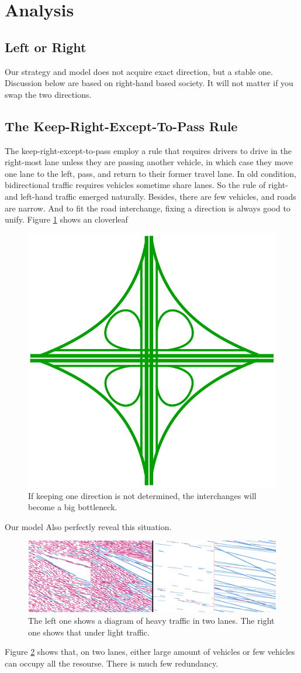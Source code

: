 \section{Analysis}
\subsection{Left or Right}
Our strategy and model does not acquire exact direction, but a stable one. Discussion below are based on right-hand based society. It will not matter if you swap the two directions. 

\subsection{The Keep-Right-Except-To-Pass Rule}
The keep-right-except-to-pass employ a rule that requires drivers to drive in the right-most lane unless they are passing another vehicle, in which case they move one lane to the left, pass, and return to their former travel lane. 
In old condition, bidirectional traffic requires vehicles sometime share lanes. 
So the rule of right- and left-hand traffic emerged naturally. 
Besides, there are few vehicles, and roads are narrow. And to fit the road interchange, fixing a direction is always good to unify. Figure \ref{fig:cloverleaf} shows an cloverleaf
\begin{figure}[H]
  \centering
  \includegraphics[width=.2\textwidth]{./img/cloverleaf.png}
  \caption{If keeping one direction is not determined, the interchanges will become a big bottleneck\cite{wikicloverleaf}. }
  \label{fig:cloverleaf}
\end{figure}
Our model Also perfectly reveal this situation. 
\begin{figure}[H]
  \centering
  \includegraphics[width=.8\textwidth]{./img/keeprightgood.png}
  \caption{The left one shows a diagram of heavy traffic in two lanes. The right one shows that under light traffic. }
  \label{fig:keeprightgood}
\end{figure}
Figure \ref{fig:keeprightgood} shows that, on two lanes, either large amount of vehicles or few vehicles can occupy all the resourse. 
There is much few redundancy. 


